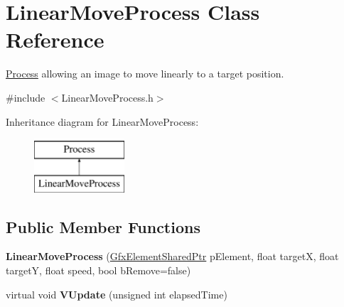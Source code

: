 \hypertarget{classLinearMoveProcess}{\section{Linear\-Move\-Process Class Reference}
\label{classLinearMoveProcess}
}


\hyperlink{classProcess}{Process} allowing an image to move linearly to a target position.  




{\ttfamily \#include $<$Linear\-Move\-Process.\-h$>$}

Inheritance diagram for Linear\-Move\-Process\-:\begin{figure}[H]
\begin{center}
\leavevmode
\includegraphics[height=2.000000cm]{classLinearMoveProcess}
\end{center}
\end{figure}
\subsection*{Public Member Functions}
\begin{DoxyCompactItemize}
\item 
\hypertarget{classLinearMoveProcess_a5c986accadb348088af4c6ae36421a65}{{\bfseries Linear\-Move\-Process} (\hyperlink{GfxElement_8h_a3e248bc53ba4f9161edd41d1b31b6724}{Gfx\-Element\-Shared\-Ptr} p\-Element, float target\-X, float target\-Y, float speed, bool b\-Remove=false)}\label{classLinearMoveProcess_a5c986accadb348088af4c6ae36421a65}

\item 
\hypertarget{classLinearMoveProcess_ab5ee04f0766fb27f27c6b7c307ba4148}{virtual void {\bfseries V\-Update} (unsigned int elapsed\-Time)}\label{classLinearMoveProcess_ab5ee04f0766fb27f27c6b7c307ba4148}

\end{DoxyCompactItemize}
